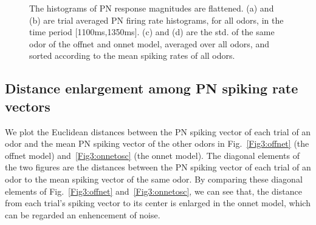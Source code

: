 \documentclass[12pt, a4paper]{article}
\begin{document}
\begin{figure}[htbp]\centering
    \hspace{0.5cm}

    \hspace{0.5cm}
\caption[Hist~Flatten]{\label{Figure2:histflatten} \small The histograms of PN response magnitudes are flattened. (a) and (b) are trial averaged PN firing rate histograms, for all odors, in the time period [1100ms,1350ms]. (c) and (d) are the std. of the same odor of the offnet and onnet model, averaged over all odors, and sorted according to the mean spiking rates of all odors.}
\end{figure}


\subsection{Distance enlargement among PN spiking rate vectors} \label{Sect:distance}
We plot the Euclidean distances between the PN spiking vector of each trial of an odor and the mean PN spiking vector of the other odors in Fig.~\ref{Fig3:offnet} (the offnet model) and~\ref{Fig3:onnetosc} (the onnet model). The diagonal elements of the two figures are the distances between the PN spiking vector of each trial of an odor to the mean spiking vector of the same odor. By comparing these diagonal elements of Fig.~\ref{Fig3:offnet} and~\ref{Fig3:onnetosc}, we can see that, the distance from each trial's spiking vector to its center is enlarged in the onnet model, which can be regarded an enhencement of noise.
\end{document}
